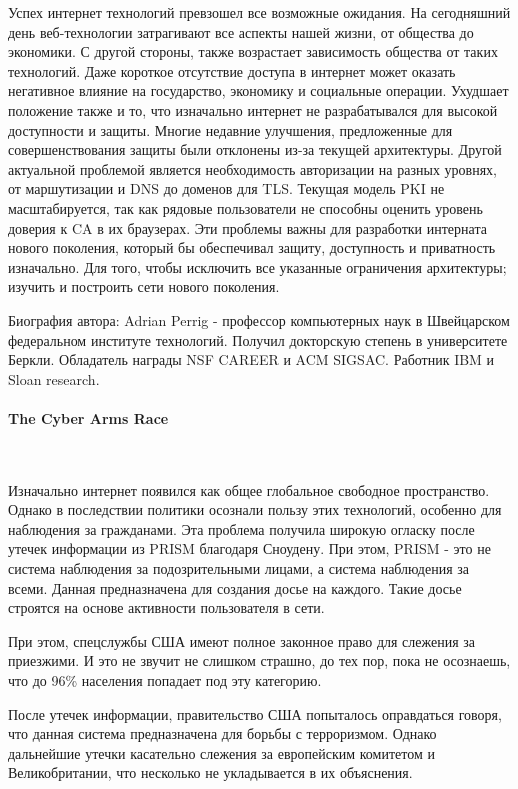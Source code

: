 \documentclass[10pt,a4paper]{article}
\begin{document}
Успех интернет технологий превзошел все возможные ожидания. На сегодняшний день веб-технологии затрагивают все аспекты нашей жизни, от общества до экономики. С другой стороны, также возрастает зависимость общества от таких технологий. Даже короткое отсутствие доступа в интернет может оказать негативное влияние на государство, экономику и социальные операции. Ухудшает положение также и то, что изначально интернет не разрабатывался для высокой доступности и защиты. Многие недавние улучшения, предложенные для совершенствования защиты были отклонены из-за текущей архитектуры. Другой актуальной проблемой является необходимость авторизации на разных уровнях, от маршутизации и DNS до доменов для TLS. Текущая модель PKI не масштабируется, так как рядовые пользователи не способны оценить уровень доверия к CA в их браузерах. Эти проблемы важны для разработки интерната нового поколения, который бы обеспечивал защиту, доступность и приватность изначально. Для того, чтобы исключить все указанные ограничения архитектуры; изучить и построить сети нового поколения.

Биография автора:
Adrian Perrig - профессор компьютерных наук в Швейцарском федеральном институте технологий. Получил докторскую степень в университете Беркли. Обладатель награды NSF CAREER и ACM SIGSAC. Работник IBM и Sloan research.

\paragraph{The Cyber Arms Race}
~

Изначально интернет появился как общее глобальное свободное пространство. Однако в последствии политики осознали пользу этих технологий, особенно для наблюдения за гражданами. Эта проблема получила широкую огласку после утечек информации из PRISM благодаря Сноудену. При этом, PRISM - это не система наблюдения за подозрительными лицами, а система наблюдения за всеми. Данная предназначена для создания досье на каждого. Такие досье строятся на основе активности пользователя в сети.

При этом, спецслужбы США имеют полное законное право для слежения за  приезжими. И это не звучит не слишком страшно, до тех пор, пока не осознаешь, что до 96\% населения попадает под эту категорию.

После утечек информации, правительство США попыталось оправдаться говоря, что данная система предназначена для борьбы с терроризмом. Однако дальнейшие утечки касательно слежения за европейским комитетом и Великобритании, что несколько не укладывается в их объяснения.
\end{document}
